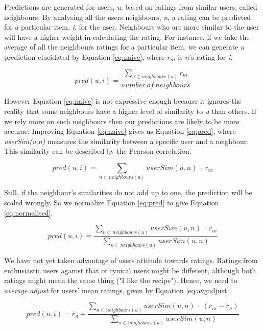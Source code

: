 Predictions are generated for users, \emph{u}, based on ratings from similar users, called neighbours. By analysing all the users neighbours, \emph{n}, a rating can be predicted for a particular item, \emph{i}, for the user. Neighbours who are more similar to the user will have a higher weight in calculating the rating. For instance, if we take the average of all the neighbours ratings for a particular item, we can generate a prediction elucidated by Equation \ref{eq:naive}, where $r_{ni}$ is \emph{n}'s rating for \emph{i}.

\begin{equation}\label{eq:naive}
pred(u,i) = \frac{\sum_{n\subset neighbours(u)} r_{ni}}{number~of~neighbours}
\end{equation}

However Equation \ref{eq:naive} is not expressive enough because it ignores the reality that some neighbours have a higher level of similarity to \emph{u} than others. If we rely more on such neighbours then our predictions are likely to be more accurae. Improving Equation \ref{eq:naive} gives us Equation \ref{eq:pred}, where \emph{userSim(u,n)} measures the similarity between a specific user and a neighbour. This similarity can be described by the Pearson correlation.

\begin{equation}\label{eq:pred}
pred(u,i) = \sum_{n\subset neighbours(u)} userSim(u,n)~\cdot~r_{ni}
\end{equation}

Still, if the neighbour's similarities do not add up to one, the prediction will be scaled wrongly. So we normalize Equation \ref{eq:pred} to give Equation \ref{eq:normalised}.

\begin{equation}\label{eq:normalised}
pred(u,i) = \frac{\sum_{n\subset neighbours(u)} userSim(u,n)~\cdot~r_{ni}}{\sum_{n\subset neighbours(u)}userSim(u,n)}
\end{equation}

We have not yet taken advantage of users attitude towards ratings. Ratings from enthusiastic users against that of cynical users might be different, although both ratings might mean the same thing ("I like the recipe"). Hence, we need to \emph{average adjust} for users' mean ratings, given by Equation \ref{eq:avgadjust}.

\begin{equation}\label{eq:avgadjust}
pred(u,i) = \overline {r}_u + \frac{\sum_{n\subset neighbours(u)} userSim(u,n)~\cdot~(r_{ni}-\overline {r}_n)}{\sum_{n\subset 
neighbours(u)}userSim(u,n)}
\end{equation}

